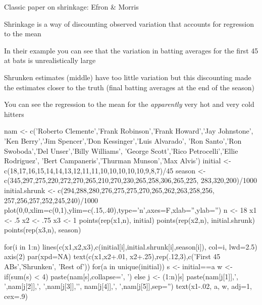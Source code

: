 Classic paper on shrinkage: Efron \& Morris~\cite{efr77sti}
\bi
\item Shrinkage is a way of discounting observed variation that accounts for regression to the mean
\item In their example you can see that the variation in batting averages for the first 45 at bats is unrealistically large
\item Shrunken estimates (middle) have too little variation but this discounting made the estimates closer to the truth (final batting averages at the end of the season)
\item You can see the regression to the mean for the \emph{apparently} very hot and very cold hitters
\ei
\begin{Schunk}
\begin{Sinput}
nam <- c('Roberto Clemente','Frank Robinson','Frank Howard','Jay Johnstone',
  	 'Ken Berry','Jim Spencer','Don Kessinger','Luis Alvarado',
		 'Ron Santo','Ron Swoboda','Del Unser','Billy Williams',
		 'George Scott','Rico Petrocelli','Ellie Rodriguez',
		 'Bert Campaneris','Thurman Munson','Max Alvis')
initial <- c(18,17,16,15,14,14,13,12,11,11,10,10,10,10,10,9,8,7)/45
season  <- c(345,297,275,220,272,270,265,210,270,230,265,258,306,265,225,
             283,320,200)/1000
initial.shrunk <- c(294,288,280,276,275,275,270,265,262,263,258,256,
                    257,256,257,252,245,240)/1000
plot(0,0,xlim=c(0,1),ylim=c(.15,.40),type='n',axes=F,xlab='',ylab='')
n  <- 18
x1 <- .5
x2 <- .75
x3 <- 1
points(rep(x1,n), initial)
points(rep(x2,n), initial.shrunk)
points(rep(x3,n), season)

for(i in 1:n) lines(c(x1,x2,x3),c(initial[i],initial.shrunk[i],season[i]),
                    col=i, lwd=2.5)
axis(2)
par(xpd=NA)
text(c(x1,x2+.01, x2+.25),rep(.12,3),c('First 45 ABs','Shrunken\nEstimates',
     'Rest of\nSeason'))
for(a in unique(initial)) {
  s <- initial==a
  w <- if(sum(s) < 4) paste(nam[s],collapse=', ') else {
	j <- (1:n)[s]
	paste(nam[j[1]],', ',nam[j[2]],', ',nam[j[3]],'\n',
		  nam[j[4]],', ',nam[j[5]],sep='')
  }
  text(x1-.02, a, w, adj=1, cex=.9)
}
\end{Sinput}
\begin{figure}[htbp]


\end{figure}
\end{Schunk}
